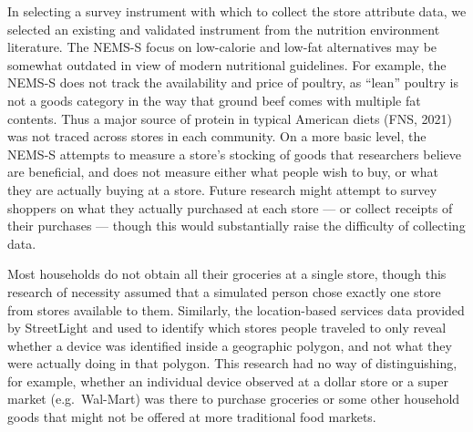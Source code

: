 \documentclass[
  letterpaper,
  number,
  review,
  3p]{elsarticle}
\begin{document}
In selecting a survey instrument with which to collect the store
attribute data, we selected an existing and validated instrument from
the nutrition environment literature. The NEMS-S focus on low-calorie
and low-fat alternatives may be somewhat outdated in view of modern
nutritional guidelines. For example, the NEMS-S does not track the
availability and price of poultry, as ``lean'' poultry is not a goods
category in the way that ground beef comes with multiple fat contents.
Thus a major source of protein in typical American diets (FNS, 2021) was
not traced across stores in each community. On a more basic level, the
NEMS-S attempts to measure a store's stocking of goods that researchers
believe are beneficial, and does not measure either what people wish to
buy, or what they are actually buying at a store. Future research might
attempt to survey shoppers on what they actually purchased at each store
--- or collect receipts of their purchases --- though this would
substantially raise the difficulty of collecting data.

Most households do not obtain all their groceries at a single store,
though this research of necessity assumed that a simulated person chose
exactly one store from stores available to them. Similarly, the
location-based services data provided by StreetLight and used to
identify which stores people traveled to only reveal whether a device
was identified inside a geographic polygon, and not what they were
actually doing in that polygon. This research had no way of
distinguishing, for example, whether an individual device observed at a
dollar store or a super market (e.g.~Wal-Mart) was there to purchase
groceries or some other household goods that might not be offered at
more traditional food markets.
\end{document}
